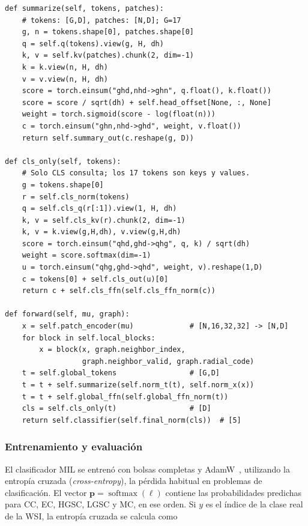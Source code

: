 \begin{lstlisting}[basicstyle=\ttfamily\footnotesize,caption={Lectura global y clasificación en seudocódigo estilo PyTorch.},label={lst:lectura-global-mil}]
def summarize(self, tokens, patches):
    # tokens: [G,D], patches: [N,D]; G=17
    g, n = tokens.shape[0], patches.shape[0]
    q = self.q(tokens).view(g, H, dh)
    k, v = self.kv(patches).chunk(2, dim=-1)
    k = k.view(n, H, dh)
    v = v.view(n, H, dh)
    score = torch.einsum("ghd,nhd->ghn", q.float(), k.float())
    score = score / sqrt(dh) + self.head_offset[None, :, None]
    weight = torch.sigmoid(score - log(float(n)))
    c = torch.einsum("ghn,nhd->ghd", weight, v.float())
    return self.summary_out(c.reshape(g, D))

def cls_only(self, tokens):
    # Solo CLS consulta; los 17 tokens son keys y values.
    g = tokens.shape[0]
    r = self.cls_norm(tokens)
    q = self.cls_q(r[:1]).view(1, H, dh)
    k, v = self.cls_kv(r).chunk(2, dim=-1)
    k, v = k.view(g,H,dh), v.view(g,H,dh)
    score = torch.einsum("qhd,ghd->qhg", q, k) / sqrt(dh)
    weight = score.softmax(dim=-1)
    u = torch.einsum("qhg,ghd->qhd", weight, v).reshape(1,D)
    c = tokens[0] + self.cls_out(u)[0]
    return c + self.cls_ffn(self.cls_ffn_norm(c))

def forward(self, mu, graph):
    x = self.patch_encoder(mu)             # [N,16,32,32] -> [N,D]
    for block in self.local_blocks:
        x = block(x, graph.neighbor_index,
                  graph.neighbor_valid, graph.radial_code)
    t = self.global_tokens                 # [G,D]
    t = t + self.summarize(self.norm_t(t), self.norm_x(x))
    t = t + self.global_ffn(self.global_ffn_norm(t))
    cls = self.cls_only(t)                 # [D]
    return self.classifier(self.final_norm(cls))  # [5]
\end{lstlisting}

\subsubsection{Entrenamiento y evaluación}

El clasificador MIL se entrenó con bolsas completas y
AdamW~\cite{loshchilov_adamw_2019}, utilizando la entropía cruzada
(\emph{cross-entropy}), la pérdida habitual en problemas de clasificación.
El vector \(\mathbf p=\operatorname{softmax}(\boldsymbol\ell)\) contiene las
probabilidades predichas para CC, EC, HGSC, LGSC y MC, en ese orden. Si \(y\)
es el índice de la clase real de la WSI, la entropía cruzada se calcula como

